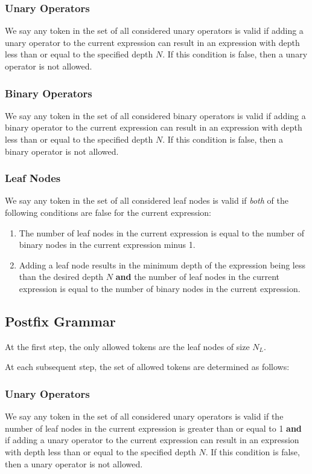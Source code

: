 \documentclass[12pt]{iopart}
\begin{document}
\subsubsection{Unary Operators}
We say any token in the set of all considered unary operators is valid if adding a unary operator to the current expression can result in an expression with depth less than or equal to the specified depth $N$. If this condition is false, then a unary operator is not allowed.
\subsubsection{Binary Operators}
We say any token in the set of all considered binary operators is valid if adding a binary operator to the current expression can result in an expression with depth less than or equal to the specified depth $N$. If this condition is false, then a binary operator is not allowed.
\subsubsection{Leaf Nodes}
We say any token in the set of all considered leaf nodes is valid if \emph{both} of the following conditions are false for the current expression:
\begin{enumerate}
    \item The number of leaf nodes in the current expression is equal to the number of binary nodes in the current expression minus 1.
    \item Adding a leaf node results in the minimum depth of the expression being less than the desired depth $N$ \textbf{and} the number of leaf nodes in the current expression is equal to the number of binary nodes in the current expression.
\end{enumerate}


\subsection{Postfix Grammar}\label{subsec:postfix_grammar}
At the first step, the only allowed tokens are the leaf nodes of size $N_L$.
\par At each subsequent step, the set of allowed tokens are determined as follows:
\subsubsection{Unary Operators}
We say any token in the set of all considered unary operators is valid if the number of leaf nodes in the current expression is greater than or equal to 1 \textbf{and} if adding a unary operator to the current expression can result in an expression with depth less than or equal to the specified depth $N$. If this condition is false, then a unary operator is not allowed.
\end{document}
